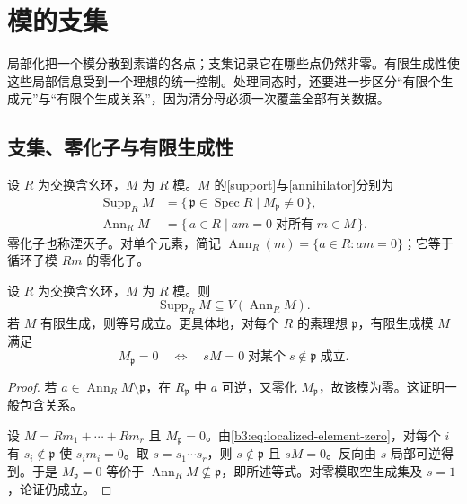 
\section{模的支集}
\label{b3:sec:0203}

局部化把一个模分散到素谱的各点；支集记录它在哪些点仍然非零。有限生成性使这些局部信息受到一个理想的统一控制。处理同态时，还要进一步区分“有限个生成元”与“有限个生成关系”，因为清分母必须一次覆盖全部有关数据。

\subsection{支集、零化子与有限生成性}
\label{b3:subsec:0203:01}

\begin{definition}\label{b3:def:support-annihilator}
	设 \(R\) 为交换含幺环，\(M\) 为 \(R\) 模。\(M\) 的[support]与[annihilator]分别为
	\[
		\begin{aligned}
			\operatorname{Supp}_R M &=\{\,\mathfrak p\in\operatorname{Spec}R\mid M_{\mathfrak p}\ne0\,\},\\
			\operatorname{Ann}_R M &=\{\,a\in R\mid am=0\;\text{对所有}\;m\in M\,\}.
		\end{aligned}
	\]
	零化子也称湮灭子。对单个元素，简记 \(\operatorname{Ann}_R(m)=\{a\in R:am=0\}\)；它等于循环子模 \(Rm\) 的零化子。
\end{definition}

\begin{theorem}\label{b3:thm:support-finite}
	设 \(R\) 为交换含幺环，\(M\) 为 \(R\) 模。则
	\[
		\operatorname{Supp}_R M\subseteq V(\operatorname{Ann}_R M).
	\]
	若 \(M\) 有限生成，则等号成立。更具体地，对每个 \(R\) 的素理想 \(\mathfrak p\)，有限生成模 \(M\) 满足
	\[
		M_{\mathfrak p}=0 \quad\Longleftrightarrow\quad sM=0\;\text{对某个}\;s\notin\mathfrak p\;\text{成立}.
	\]
\end{theorem}
\begin{proof}
	若 \(a\in\operatorname{Ann}_R M\setminus\mathfrak p\)，在 \(R_{\mathfrak p}\) 中 \(a\) 可逆，又零化 \(M_{\mathfrak p}\)，故该模为零。这证明一般包含关系。

	设 \(M=Rm_1+\cdots+Rm_r\) 且 \(M_{\mathfrak p}=0\)。由\eqref{b3:eq:localized-element-zero}，对每个 \(i\) 有 \(s_i\notin\mathfrak p\) 使 \(s_im_i=0\)。取 \(s=s_1\cdots s_r\)，则 \(s\notin\mathfrak p\) 且 \(sM=0\)。反向由 \(s\) 局部可逆得到。于是 \(M_{\mathfrak p}=0\) 等价于 \(\operatorname{Ann}_R M\not\subseteq\mathfrak p\)，即所述等式。对零模取空生成集及 \(s=1\)，论证仍成立。
\end{proof}

